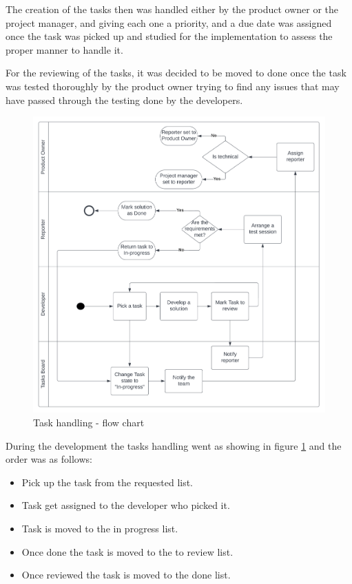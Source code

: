 The creation of the tasks then was handled either by the product owner or the project
manager, and giving each one a priority, and a due date was assigned once the task was
picked up and studied for the implementation to assess the proper manner to handle it.

For the reviewing of the tasks, it was decided to be moved to done once the task was
tested thoroughly by the product owner trying to find any issues that may have
passed through the testing done by the developers.

\begin{figure}[!ht]
    \centering
    \includegraphics[width=\textwidth]{images/task handling flow.png}
    \caption{Task handling - flow chart}
    \label{fig:task_handling}
\end{figure}

During the development the tasks handling went as showing in figure \ref{fig:task_handling}
and the order was as follows:
    \begin{itemize}
        \item Pick up the task from the requested list.
        \item Task get assigned to the developer who picked it.
        \item Task is moved to the in progress list.
        \item Once done the task is moved to the to review list.
        \item Once reviewed the task is moved to the done list.
    \end{itemize}

